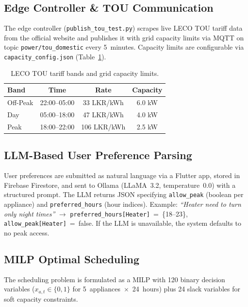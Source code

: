 \documentclass[10pt,a4paper,twocolumn]{article}
\begin{document}
\subsection{Edge Controller \& TOU Communication}
The edge controller (\texttt{publish\_tou\_test.py}) scrapes live LECO TOU tariff data from the official website and publishes it with grid capacity limits via MQTT on topic \texttt{power/tou\_domestic} every 5~minutes. Capacity limits are configurable via \texttt{capacity\_config.json} (Table~\ref{tab:tou}).

\begin{table}[H]
    \centering
    \caption{LECO TOU tariff bands and grid capacity limits.}
    \label{tab:tou}
    \small
    \begin{tabular}{@{}lccc@{}}
        \toprule
        \textbf{Band} & \textbf{Time} & \textbf{Rate} & \textbf{Capacity} \\
        \midrule
        Off-Peak & 22:00--05:00 & 33 LKR/kWh & 6.0 kW \\
        Day      & 05:00--18:00 & 47 LKR/kWh & 4.0 kW \\
        Peak     & 18:00--22:00 & 106 LKR/kWh & 2.5 kW \\
        \bottomrule
    \end{tabular}
\end{table}

\subsection{LLM-Based User Preference Parsing}
User preferences are submitted as natural language via a Flutter app, stored in Firebase Firestore, and sent to Ollama (LLaMA~3.2, temperature~0.0) with a structured prompt. The LLM returns JSON specifying \texttt{allow\_peak} (boolean per appliance) and \texttt{preferred\_hours} (hour indices). Example: \textit{``Heater need to turn only night times''} $\rightarrow$ \texttt{preferred\_hours[Heater]}~=~\{18--23\}, \texttt{allow\_peak[Heater]}~=~false. If the LLM is unavailable, the system defaults to no peak access.

\subsection{MILP Optimal Scheduling}
The scheduling problem is formulated as a MILP with 120 binary decision variables ($x_{a,t} \in \{0,1\}$ for 5~appliances~$\times$~24~hours) plus 24 slack variables for soft capacity constraints.
\end{document}
